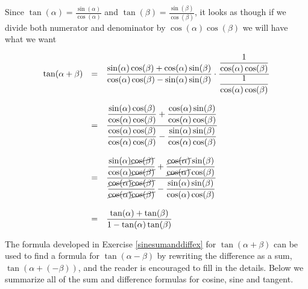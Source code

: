 {\begin{enumerate}
Since  $\tan(\alpha) = \frac{\sin(\alpha)}{\cos(\alpha)}$ and $\tan(\beta) = \frac{\sin(\beta)}{\cos(\beta)}$, it looks as though if we divide both numerator and denominator by $\cos(\alpha) \cos(\beta)$ we will have what we want

\[ \begin{array}{rcl}

\tan(\alpha + \beta) & = & \dfrac{\sin(\alpha) \cos(\beta) + \cos(\alpha) \sin(\beta)}{\cos(\alpha) \cos(\beta) - \sin(\alpha) \sin(\beta)} \cdot\dfrac{\dfrac{1}{\cos(\alpha) \cos(\beta)}}{\dfrac{1}{\cos(\alpha) \cos(\beta)}}\\
                    &   & \\
 										& = & \dfrac{\dfrac{\sin(\alpha) \cos(\beta)}{\cos(\alpha) \cos(\beta)} + \dfrac{\cos(\alpha) \sin(\beta)}{\cos(\alpha) \cos(\beta)}}{\dfrac{\cos(\alpha) \cos(\beta)}{\cos(\alpha) \cos(\beta)} - \dfrac{\sin(\alpha) \sin(\beta)}{\cos(\alpha) \cos(\beta)}}\\
                    &   & \\
										& = & \dfrac{\dfrac{\sin(\alpha) \cancel{\cos(\beta)}}{\cos(\alpha) \cancel{\cos(\beta)}} + \dfrac{\cancel{\cos(\alpha)} \sin(\beta)}{\cancel{\cos(\alpha)} \cos(\beta)}}{\dfrac{\cancel{\cos(\alpha)} \cancel{\cos(\beta)}}{\cancel{\cos(\alpha)} \cancel{\cos(\beta)}} - \dfrac{\sin(\alpha) \sin(\beta)}{\cos(\alpha) \cos(\beta)}}\\
                    &   & \\
										& = & \dfrac{\tan(\alpha) + \tan(\beta)}{1 -\tan(\alpha) \tan(\beta)}\\
\end{array} \]

\end{enumerate}
}

\medskip

The formula developed in Exercise \ref{sinesumanddiffex} for $\tan(\alpha + \beta)$ can be used to find a formula for $\tan(\alpha - \beta)$ by rewriting the difference as a sum, $\tan(\alpha + (-\beta))$, and the reader is encouraged to fill in the details.  Below we summarize all of the sum and difference formulas for cosine, sine and tangent.

\smallskip

